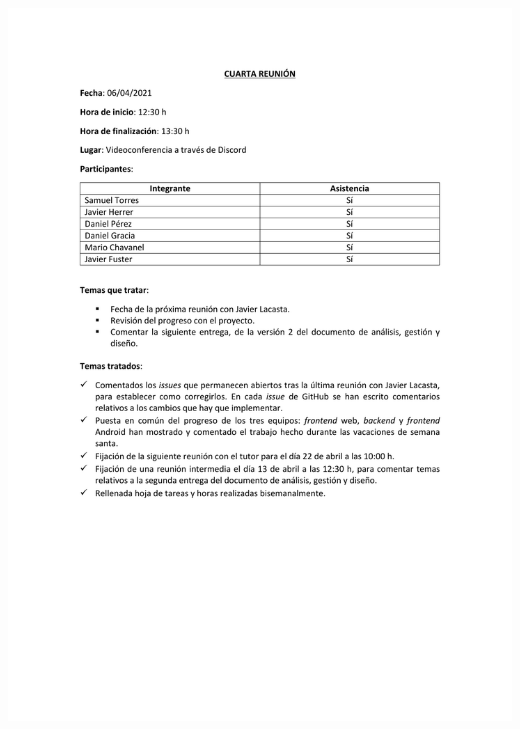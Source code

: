 \documentclass{article}
\begin{document}
\includegraphics[width=\textwidth]{../images/actas/Acta_reunion_4.pdf}
\end{document}
